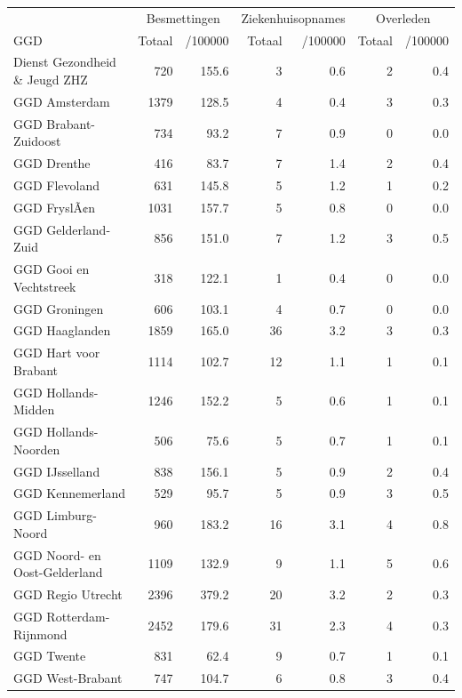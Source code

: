 \documentclass[
  english,
  man,floatsintext]{apa6}
\begin{document}
\begin{table}
\centering\begingroup\fontsize{10}{12}\selectfont

\begin{threeparttable}
\begin{tabular}{lrrrrrr}
\toprule
\multicolumn{1}{c}{ } & \multicolumn{2}{c}{Besmettingen} & \multicolumn{2}{c}{Ziekenhuisopnames} & \multicolumn{2}{c}{Overleden} \\
\cmidrule(l{3pt}r{3pt}){2-3} \cmidrule(l{3pt}r{3pt}){4-5} \cmidrule(l{3pt}r{3pt}){6-7}
GGD & Totaal & /100000 & Totaal & /100000 & Totaal & /100000\\
\midrule
Dienst Gezondheid \& Jeugd ZHZ & 720 & 155.6 & 3 & 0.6 & 2 & 0.4\\
GGD Amsterdam & 1379 & 128.5 & 4 & 0.4 & 3 & 0.3\\
GGD Brabant-Zuidoost & 734 & 93.2 & 7 & 0.9 & 0 & 0.0\\
GGD Drenthe & 416 & 83.7 & 7 & 1.4 & 2 & 0.4\\
GGD Flevoland & 631 & 145.8 & 5 & 1.2 & 1 & 0.2\\
GGD FryslÃ¢n & 1031 & 157.7 & 5 & 0.8 & 0 & 0.0\\
GGD Gelderland-Zuid & 856 & 151.0 & 7 & 1.2 & 3 & 0.5\\
GGD Gooi en Vechtstreek & 318 & 122.1 & 1 & 0.4 & 0 & 0.0\\
GGD Groningen & 606 & 103.1 & 4 & 0.7 & 0 & 0.0\\
GGD Haaglanden & 1859 & 165.0 & 36 & 3.2 & 3 & 0.3\\
GGD Hart voor Brabant & 1114 & 102.7 & 12 & 1.1 & 1 & 0.1\\
GGD Hollands-Midden & 1246 & 152.2 & 5 & 0.6 & 1 & 0.1\\
GGD Hollands-Noorden & 506 & 75.6 & 5 & 0.7 & 1 & 0.1\\
GGD IJsselland & 838 & 156.1 & 5 & 0.9 & 2 & 0.4\\
GGD Kennemerland & 529 & 95.7 & 5 & 0.9 & 3 & 0.5\\
GGD Limburg-Noord & 960 & 183.2 & 16 & 3.1 & 4 & 0.8\\
GGD Noord- en Oost-Gelderland & 1109 & 132.9 & 9 & 1.1 & 5 & 0.6\\
GGD Regio Utrecht & 2396 & 379.2 & 20 & 3.2 & 2 & 0.3\\
GGD Rotterdam-Rijnmond & 2452 & 179.6 & 31 & 2.3 & 4 & 0.3\\
GGD Twente & 831 & 62.4 & 9 & 0.7 & 1 & 0.1\\
GGD West-Brabant & 747 & 104.7 & 6 & 0.8 & 3 & 0.4\\

\end{tabular}
\end{threeparttable}
\end{table}
\end{document}
